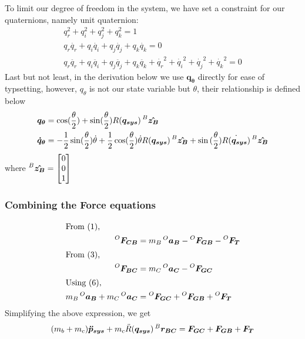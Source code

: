 To limit our degree of freedom in the system, we have set a constraint for our quaternions, namely unit quaternion:
\begin{align}
  q_r^2 + q_i^2 + q_j^2 + q_k^2 = 1 \\
  q_r\dot{q_r} + q_i\dot{q_i} + q_j\dot{q_j} + q_k\dot{q_k} = 0\\
  q_r\ddot{q_r} + q_i\ddot{q_i} + q_j\ddot{q_j} + q_k\ddot{q_k} + \dot{q_r}^2 + \dot{q_i}^2 + \dot{q_j}^2 + \dot{q_k}^2 = 0
\end{align}
Last but not least, in the derivation below we use $\bm{q_\theta}$ directly for ease of typsetting, however, $q_{\theta}$ is not our state variable but $\theta$, their relationship is defined below
\begin{align*}
  \bm{q_\theta} &= \cos(\frac{\theta}{2}) + \sin(\frac{\theta}{2})R(\bm{q_{sys}})\prescript{B}{}{\bm{\hat{z_B}}} \\
  \bm{\dot{q}_\theta} &= -\frac{1}{2}\sin(\frac{\theta}{2})\dot{\theta} + \frac{1}{2}\cos(\frac{\theta}{2})\dot{\theta}R(\bm{q_{sys}})\prescript{B}{}{\bm{\hat{z_B}}} + \sin{(\frac{\theta}{2})}\dot{R(\bm{q_{sys}})} \prescript{B}{}{\bm{\hat{z_B}}}
\end{align*}
where $\prescript{B}{}{\bm{\hat{z_B}}} =
\begin{bmatrix}
    0\\ 0\\ 1
\end{bmatrix}
$
\subsubsection{Combining the Force equations}
\begin{align*}
  \shortintertext{From (1),}
  \prescript{O}{}{\bm{F_{CB}}} &= m_B \prescript{O}{}{\bm{a_B}} - \prescript{O}{}{\bm{F_{GB}}} - \prescript{O}{}{\bm{F_{T}}} \\
  \shortintertext{From (3),}
  \prescript{O}{}{\bm{F_{BC}}} &= m_C \prescript{O}{}{\bm{a_C}} - \prescript{O}{}{\bm{F_{GC}}} \\
  \shortintertext{Using (6),}
  m_B \prescript{O}{}{\bm{a_B}} + m_C \prescript{O}{}{\bm{a_C}} &= \prescript{O}{}{\bm{F_{GC}}} + \prescript{O}{}{\bm{F_{GB}}} + \prescript{O}{}{\bm{F_{T}}} 
\end{align*}
Simplifying the above expression, we get
\begin{equation}
    (m_b + m_c) \bm{\ddot{p}_{sys}} + m_c \ddot{R}(\bm{q_{sys}}) \prescript{B}{}{\bm{r_{BC}}} = \bm{F_{GC}} + \bm{F_{GB}} + \bm{F_{T}} 
\end{equation}

